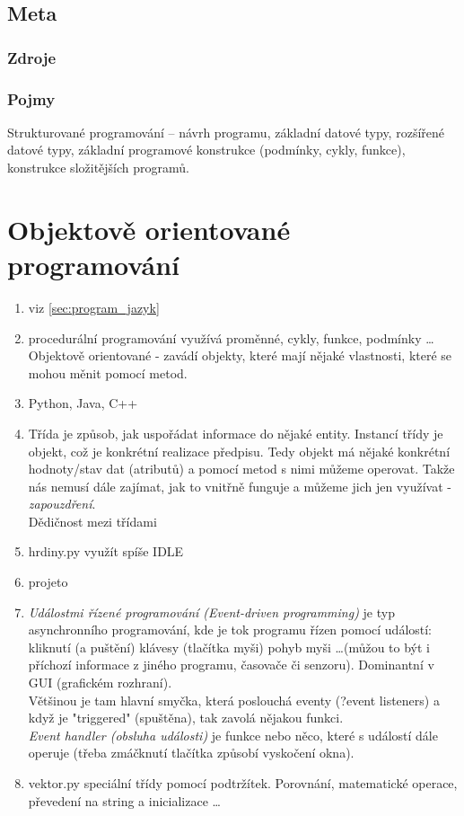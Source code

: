 \documentclass[12pt]{article}
\begin{document}
\subsection{Meta}
\subsubsection{Zdroje}
\subsubsection{Pojmy}
Strukturované programování – návrh programu, základní datové typy, rozšířené datové typy, základní programové konstrukce (podmínky, cykly, funkce), konstrukce složitějších programů.

\section{Objektově orientované programování}
\begin{enumerate}
\item viz \ref{sec:program_jazyk}
\item procedurální programování využívá proměnné, cykly, funkce, podmínky \dots \\
Objektově orientované - zavádí objekty, které mají nějaké vlastnosti, které se mohou měnit pomocí metod.
\item Python, Java, C++
\item Třída je způsob, jak uspořádat informace do nějaké entity. Instancí třídy je objekt, což je konkrétní realizace předpisu. Tedy objekt má nějaké konkrétní hodnoty/stav dat (atributů) a pomocí metod s nimi můžeme operovat. Takže nás nemusí dále zajímat, jak to vnitřně funguje a můžeme jich jen využívat - \emph{zapouzdření}.\\
Dědičnost mezi třídami
\item hrdiny.py využít spíše IDLE
\item projeto
\item \emph{Událostmi řízené programování (Event-driven programming)} je typ asynchronního programování, kde je tok programu řízen pomocí událostí: kliknutí (a puštění) klávesy (tlačítka myši) pohyb myši \dots (můžou to být i příchozí informace z jiného programu, časovače či senzoru). Dominantní v GUI (grafickém rozhraní).\\
Většinou je tam hlavní smyčka, která poslouchá eventy (?event listeners) a když je "triggered" (spuštěna), tak zavolá nějakou funkci.\\
\emph{Event handler (obsluha události)} je funkce nebo něco, které s událostí dále operuje (třeba zmáčknutí tlačítka způsobí vyskočení okna).
\item vektor.py speciální třídy pomocí podtržítek. Porovnání, matematické operace, převedení na string a inicializace \dots
\end{enumerate}
\end{document}

